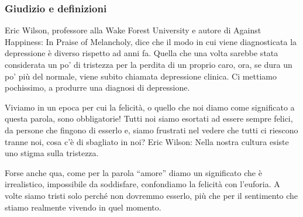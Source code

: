 \documentclass[12pt]{book} %
\begin{document}
\subsubsection{Giudizio e definizioni}
Eric Wilson, professore alla Wake Forest University e autore di Against Happiness: In Praise of Melancholy, dice che il
modo in cui viene diagnosticata la depressione è diverso rispetto ad anni fa. {\textquotedbl}Quella che una volta
sarebbe stata considerata un po' di tristezza per la perdita di un proprio caro, ora, se dura un po' più del normale,
viene subito chiamata depressione clinica. Ci mettiamo pochissimo, a produrre una diagnosi di
depressione.{\textquotedbl}


\bigskip

Viviamo in un epoca per cui la felicità, o quello che noi diamo come significato a questa parola, sono obbligatorie!
Tutti noi siamo esortati ad essere sempre felici, da persone che fingono di esserlo e, siamo frustrati nel vedere che
tutti ci riescono tranne noi, cosa c'è di sbagliato in noi? Eric Wilson: {\textquotedbl}Nella
nostra cultura esiste uno stigma sulla tristezza.{\textquotedbl}


\bigskip

Forse anche qua, come per la parola “amore” diamo un significato che è irrealistico, impossibile da soddisfare,
confondiamo la felicità con l'euforia. A volte siamo tristi solo perché non dovremmo esserlo, più
che per il sentimento che stiamo realmente vivendo in quel momento.


\bigskip
\end{document}

